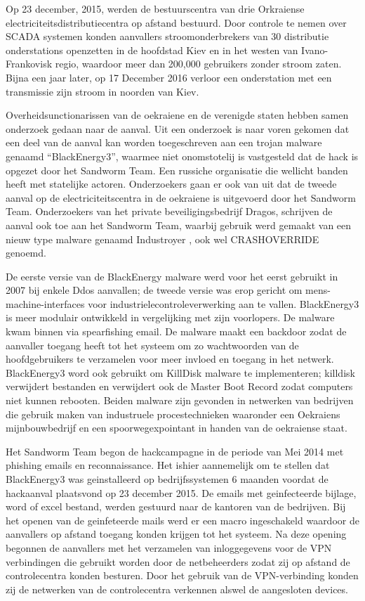 {Op 23 december, 2015, werden de bestuurscentra van drie Orkraiense electriciteitsdistributiecentra
op afstand bestuurd. Door controle te nemen over SCADA systemen konden aanvallers
stroomonderbrekers van 30 distributie onderstations openzetten in de hoofdstad Kiev en in het
westen van Ivano-Frankovisk regio, waardoor meer dan 200,000 gebruikers zonder stroom zaten.
Bijna een jaar later, op 17 December 2016 verloor een onderstation met een transmissie zijn stroom
in noorden van Kiev.

Overheidsunctionarissen van de oekraiene en de verenigde staten hebben samen onderzoek gedaan
naar de aanval. Uit een onderzoek is naar voren gekomen dat een deel van de aanval kan worden
toegeschreven aan een trojan malware genaamd “BlackEnergy3”, waarmee niet onomstotelij is
vastgesteld dat de hack is opgezet door het Sandworm Team. Een russiche organisatie die wellicht
banden heeft met statelijke actoren. Onderzoekers gaan er ook van uit dat de tweede aanval op de
electriciteitscentra in de oekraiene is uitgevoerd door het Sandworm Team. Onderzoekers van het
private beveiligingsbedrijf Dragos, schrijven de aanval ook toe aan het Sandworm Team, waarbij
gebruik werd gemaakt van een nieuw type malware genaamd Industroyer , ook wel CRASHOVERRIDE
genoemd.

De eerste versie van de BlackEnergy malware werd voor het eerst gebruikt in 2007 bij enkele Ddos
aanvallen; de tweede versie was erop gericht om mens-machine-interfaces voor
industrielecontroleverwerking aan te vallen. BlackEnergy3 is meer modulair ontwikkeld in
vergelijking met zijn voorlopers. De malware kwam binnen via spearfishing email. De malware maakt
een backdoor zodat de aanvaller toegang heeft tot het systeem om zo wachtwoorden van de
hoofdgebruikers te verzamelen voor meer invloed en toegang in het netwerk. BlackEnergy3 word
ook gebruikt om KillDisk malware te implementeren; killdisk verwijdert bestanden en verwijdert ook
de Master Boot Record zodat computers niet kunnen rebooten. Beiden malware zijn gevonden in
netwerken van bedrijven die gebruik maken van industruele procestechnieken waaronder een
Oekraiens mijnbouwbedrijf en een spoorwegexpointant in handen van de oekraiense staat.

Het Sandworm Team begon de hackcampagne in de periode van Mei 2014 met phishing emails en
reconnaissance. Het ishier aannemelijk om te stellen dat BlackEnergy3 was geinstalleerd op
bedrijfssystemen 6 maanden voordat de hackaanval plaatsvond op 23 december 2015. De emails
met geinfecteerde bijlage, word of excel bestand, werden gestuurd naar de kantoren van de
bedrijven. Bij het openen van de geinfeteerde mails werd er een macro ingeschakeld waardoor de
aanvallers op afstand toegang konden krijgen tot het systeem. Na deze opening begonnen de
aanvallers met het verzamelen van inloggegevens voor de VPN verbindingen die gebruikt worden
door de netbeheerders zodat zij op afstand de controlecentra konden besturen. Door het gebruik van
de VPN-verbinding konden zij de netwerken van de controlecentra verkennen alswel de aangesloten
devices.

}
